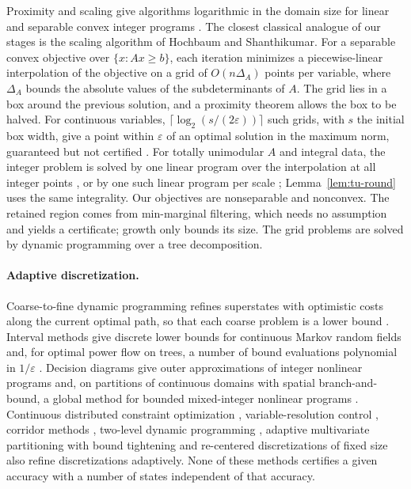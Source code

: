 Proximity and scaling give algorithms logarithmic in the domain size for
linear and separable convex integer programs
\cite{CookGerardsSchrijverTardos1986,HochbaumShanthikumar1990,
GranotSkorinKapov1990,HunkenschroderEtAl2026,EisenbrandEtAl2025}. The closest
classical analogue of our stages is the scaling algorithm of Hochbaum and
Shanthikumar. For a separable convex objective over $\{x:Ax\ge b\}$, each
iteration minimizes a piecewise-linear interpolation of the objective on a
grid of $O(n\Delta_A)$ points per variable, where $\Delta_A$ bounds the
absolute values of the subdeterminants of $A$. The grid lies in a box around
the previous solution, and a proximity theorem allows the box to be halved.
For continuous variables, $\lceil\log_2(s/(2\varepsilon))\rceil$ such
grids, with $s$ the initial box width, give a point within $\varepsilon$ of
an optimal solution in the maximum norm, guaranteed but not certified
\cite[Section~1.3 and Theorems~1.1, 3.8 and~4.4]{HochbaumShanthikumar1990}.
For totally unimodular $A$ and integral data, the integer problem is solved
by one linear program over the interpolation at all integer points
\cite{Meyer1977}, or by one such linear program per scale
\cite[Theorem~4.3]{HochbaumShanthikumar1990}; Lemma~\ref{lem:tu-round}
uses the same integrality. Our objectives are nonseparable and nonconvex. The
retained region comes from min-marginal filtering, which needs no assumption
and yields a certificate; growth only bounds its size. The grid problems are
solved by dynamic programming over a tree decomposition.

\paragraph{Adaptive discretization.}
Coarse-to-fine dynamic programming refines superstates with optimistic costs
along the current optimal path, so that each coarse problem is a lower bound
\cite{Raphael2001,FelzenszwalbMcAllester2007}. Interval methods give discrete
lower bounds for continuous Markov random fields \cite{PengEtAl2011} and, for
optimal power flow on trees, a number of bound evaluations polynomial in
$1/\varepsilon$ \cite[Theorem~2]{DvijothamEtAl2017}. Decision diagrams give
outer approximations of integer nonlinear programs \cite{DavarniaVanHoeve2021}
and, on partitions of continuous domains with spatial branch-and-bound, a
global method for bounded mixed-integer nonlinear programs
\cite{DavarniaKiaghadiQiu2026}. Continuous distributed constraint optimization
\cite{HoangEtAl2020,TroullinosEtAl2022}, variable-resolution control
\cite{MunosMoore2002}, corridor methods \cite{HeidariEtAl1971}, two-level
dynamic programming \cite{LeaverFayKuhlmanSnoeyink2005}, adaptive
multivariate partitioning with bound tightening \cite{NagarajanEtAl2019} and
re-centered discretizations of fixed size \cite{GupteKosterKuhnke2022} also
refine discretizations adaptively. None of these methods certifies a given
accuracy with a number of states independent of that accuracy.

